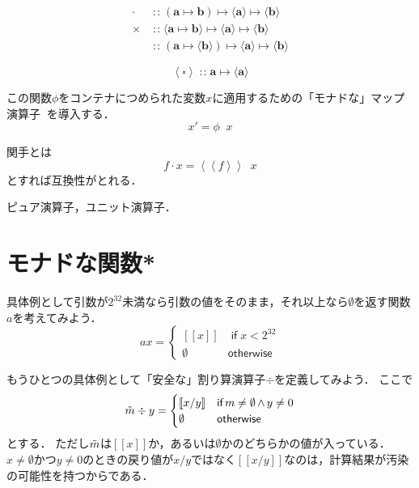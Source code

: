\documentclass[a5paper,draft]{jsbook}
\def\[{\left[\!\left[}
\def\]{\right]\!\right]}
\newcommand{\mathTypeParameter}[1]{\mathbf{#1}}
\newcommand{\mathMaybeWith}[1]{\[#1\]}
\newcommand{\mathPureWith}[1]{\left\langle#1\right\rangle}
\newcommand{\mathUnitWith}[1]{\left\langle\!\left\langle#1\right\rangle\!\right\rangle}
\newcommand{\mathMaybeVar}[1]{\Tilde{#1}}
\newcommand{\mathNothing}{\emptyset}%
\newcommand{\mathSomething}{\square}
\newcommand{\mathBinaryOperator}[1]{\operatorname{#1}}
\newcommand{\mathAnd}{\mathBinaryOperator{\wedge}}
\newcommand{\mathApplicativeGeneralMap}{\times}
\newcommand{\mathGeneralMap}{\mathBinaryOperator{\cdot}}
\newcommand{\mathIn}{\mathBinaryOperator{:\!:}}
\newcommand{\mathMapsTo}{\mapsto}
\newcommand{\mathKeyword}[1]{\operatorname{\textsf{#1}}}
\newcommand{\mathIf}{\mathKeyword{if}}
\newcommand{\mathOtherwise}{\mathKeyword{otherwise}}
\newcommand{\mathMorph}[2]{#1\mathMapsTo#2}
\newcommand{\mathMorphII}[3]{#1\mathMapsTo#2\mathMapsTo#3}
\DeclareMathOperator{\hsklMonadMap}{{DO NOT USE}--\heartsuit}
\begin{document}
\begin{align*}
\mathGeneralMap&\mathIn{}\mathMorphII{(\mathMorph{\mathTypeParameter{a}}{\mathTypeParameter{b}})}{\langle\mathTypeParameter{a}\rangle}{\langle\mathTypeParameter{b}
\rangle}\\
\mathApplicativeGeneralMap&\mathIn{}\mathMorphII{\langle\mathMorph{\mathTypeParameter{a}}{\mathTypeParameter{b}}\rangle}{\langle\mathTypeParameter{a}\rangle}{\langle\mathTypeParameter{b}\rangle}\\
\hsklMonadMap&\mathIn{}\mathMorphII{(\mathMorph{\mathTypeParameter{a}}{\langle\mathTypeParameter{b}\rangle})}{\langle\mathTypeParameter{a}\rangle}{\langle{\mathTypeParameter{b}}\rangle}
\end{align*}

$$\mathPureWith{\mathSomething}\mathIn\mathMorph{\mathTypeParameter{a}}{\langle\mathTypeParameter{a}\rangle}$$

この関数$\phi$をコンテナにつめられた変数$x$に適用するための「モナドな」マップ演算子$\hsklMonadMap$を導入する．
$$x'=\phi\hsklMonadMap x$$

関手とは
$$f\mathGeneralMap x=\mathUnitWith{f}\hsklMonadMap x$$
とすれば互換性がとれる．


ピュア演算子，ユニット演算子．


\section{モナドな関数*}


具体例として引数が$2^{32}$未満なら引数の値をそのまま，それ以上なら$\mathNothing$を返す関数$a$を考えてみよう．
\begin{equation}
ax=\begin{cases}
\mathMaybeWith{x}&\mathIf x<2^{32}\\
\mathNothing&\mathOtherwise
\end{cases}
\end{equation}


もうひとつの具体例として「安全な」割り算演算子$\div$を定義してみよう．
ここで
\begin{equation}
\mathMaybeVar{m}\div y=\begin{cases}\mathMaybeWith{x/y}&\mathIf m\neq\mathNothing\mathAnd y\neq0\\
\mathNothing&\mathOtherwise\end{cases}
\end{equation}
とする．
ただし$\mathMaybeVar{m}$は$\mathMaybeWith{x}$か，あるいは$\mathNothing$かのどちらかの値が入っている．
$x\neq\mathNothing$かつ$y\neq0$のときの戻り値が$x/y$ではなく$\mathMaybeWith{x/y}$なのは，計算結果が汚染の可能性を持つからである．
\end{document}
